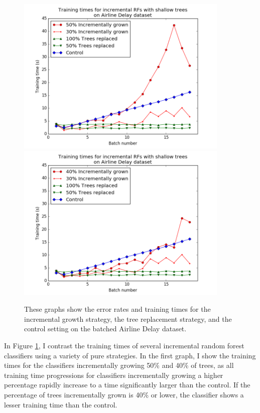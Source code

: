 \begin{figure}
  \centering
  \includegraphics[width=4in]{planeshallow_line_time}
  \includegraphics[width=4in]{planedeep_line_time}
  \caption{These graphs show the error rates and training times for the
incremental growth strategy, the tree replacement strategy, and the control
setting on the batched Airline Delay dataset.}
  \label{fig:plane1}
\end{figure}

In Figure \ref{fig:plane1}, I contrast the training times of several
incremental random forest classifiers using a variety of pure strategies. In
the first graph, I show the training times for the classifiers incrementally
growing 50\% and 40\% of trees, as all training time progressions for
classifiers incrementally growing a higher percentage rapidly increase to a
time significantly larger than the control. If the percentage of trees
incrementally grown is 40\% or lower, the classifier shows a lesser training
time than the control.

